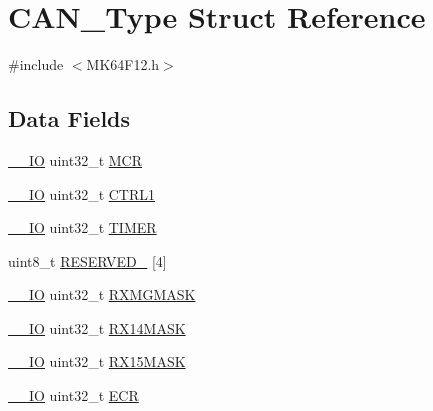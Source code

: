 \hypertarget{struct_c_a_n___type}{}\section{C\+A\+N\+\_\+\+Type Struct Reference}
\label{struct_c_a_n___type}


{\ttfamily \#include $<$M\+K64\+F12.\+h$>$}

\subsection*{Data Fields}
\begin{DoxyCompactItemize}
\item 
\mbox{\hyperlink{core__cm4_8h_aec43007d9998a0a0e01faede4133d6be}{\+\_\+\+\_\+\+IO}} uint32\+\_\+t \mbox{\hyperlink{group___v_r_e_f___peripheral___access___layer_ga27af4e9f888f0b7b1e8da7e002d98798}{M\+CR}}
\item 
\mbox{\hyperlink{core__cm4_8h_aec43007d9998a0a0e01faede4133d6be}{\+\_\+\+\_\+\+IO}} uint32\+\_\+t \mbox{\hyperlink{group___v_r_e_f___peripheral___access___layer_ga57996484e084b8cc5005765971c49681}{C\+T\+R\+L1}}
\item 
\mbox{\hyperlink{core__cm4_8h_aec43007d9998a0a0e01faede4133d6be}{\+\_\+\+\_\+\+IO}} uint32\+\_\+t \mbox{\hyperlink{group___v_r_e_f___peripheral___access___layer_gae7b8b29e4cdd642fd36ac94c68c33357}{T\+I\+M\+ER}}
\item 
uint8\+\_\+t \mbox{\hyperlink{group___v_r_e_f___peripheral___access___layer_ga71277aaa40be4473ac2521981f273bd3}{R\+E\+S\+E\+R\+V\+E\+D\+\_}} \mbox{[}4\mbox{]}
\item 
\mbox{\hyperlink{core__cm4_8h_aec43007d9998a0a0e01faede4133d6be}{\+\_\+\+\_\+\+IO}} uint32\+\_\+t \mbox{\hyperlink{group___v_r_e_f___peripheral___access___layer_ga5c2048bfa07070031acbee2dd7e64391}{R\+X\+M\+G\+M\+A\+SK}}
\item 
\mbox{\hyperlink{core__cm4_8h_aec43007d9998a0a0e01faede4133d6be}{\+\_\+\+\_\+\+IO}} uint32\+\_\+t \mbox{\hyperlink{group___v_r_e_f___peripheral___access___layer_ga30926c424788b94e5d29ab98cb8bac1e}{R\+X14\+M\+A\+SK}}
\item 
\mbox{\hyperlink{core__cm4_8h_aec43007d9998a0a0e01faede4133d6be}{\+\_\+\+\_\+\+IO}} uint32\+\_\+t \mbox{\hyperlink{group___v_r_e_f___peripheral___access___layer_gab3ebd58a3a24c6ca80f804ea56fd3d3b}{R\+X15\+M\+A\+SK}}
\item 
\mbox{\hyperlink{core__cm4_8h_aec43007d9998a0a0e01faede4133d6be}{\+\_\+\+\_\+\+IO}} uint32\+\_\+t \mbox{\hyperlink{group___v_r_e_f___peripheral___access___layer_ga1c146954c72b1cc2c05a85dd55ae5c9b}{E\+CR}}

\end{DoxyCompactItemize}
